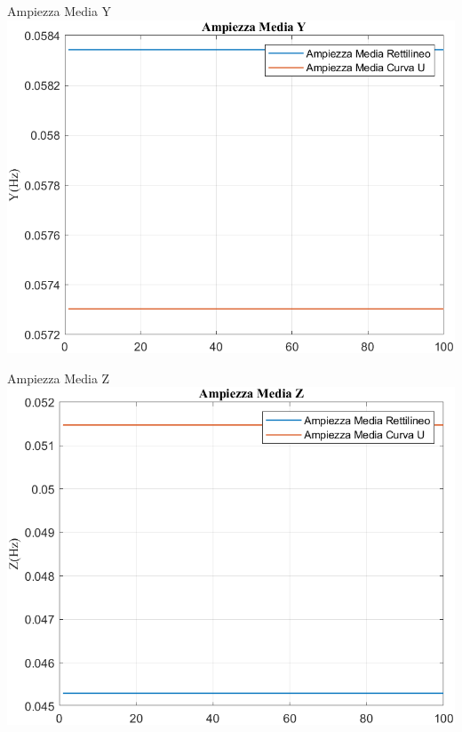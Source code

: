 \documentclass[beamer]{standalone}
\begin{document}
	\begin{frame}{{Ampiezza Media Y}}					
		\centering\includegraphics[height=.8\textheight]{figure/Mag/Trasformata/Ampiezza MediaY}
	\end{frame}
	
	\begin{frame}{{Ampiezza Media Z}}					
		\centering\includegraphics[height=.8\textheight]{figure/Mag/Trasformata/Ampiezza MediaZ}
	\end{frame}
	
\end{document}
